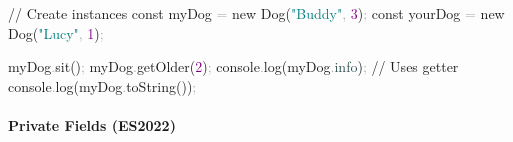 \documentclass[
  justified,
  openright,
]{tufte-book}
\let\subsubsection\paragraph
\let\paragraph\paragraph
\newcommand{\AttributeTok}[1]{\textcolor{DarkSlateGray}{#1}}
\newcommand{\BuiltInTok}[1]{#1}
\newcommand{\CommentTok}[1]{\textcolor{MidGray}{#1}}
\newcommand{\DecValTok}[1]{\textcolor{Purple}{#1}}
\newcommand{\FunctionTok}[1]{\textcolor{BrandBlue}{#1}}
\newcommand{\KeywordTok}[1]{\textcolor{BrandBlue}{#1}}
\newcommand{\NormalTok}[1]{#1}
\newcommand{\OperatorTok}[1]{\textcolor{DarkGray}{#1}}
\newcommand{\StringTok}[1]{\textcolor{Teal}{#1}}
\newenvironment{Shaded}{%
  \begin{snugshade}
}{%
  \end{snugshade}
}
\let\subsubsection\paragraph
\let\paragraph\paragraph
\begin{document}
\begin{Shaded}
\begin{Highlighting}[]
\CommentTok{// Create instances}
\KeywordTok{const}\NormalTok{ myDog }\OperatorTok{=} \KeywordTok{new} \FunctionTok{Dog}\NormalTok{(}\StringTok{"Buddy"}\OperatorTok{,} \DecValTok{3}\NormalTok{)}\OperatorTok{;}
\KeywordTok{const}\NormalTok{ yourDog }\OperatorTok{=} \KeywordTok{new} \FunctionTok{Dog}\NormalTok{(}\StringTok{"Lucy"}\OperatorTok{,} \DecValTok{1}\NormalTok{)}\OperatorTok{;}

\NormalTok{myDog}\OperatorTok{.}\FunctionTok{sit}\NormalTok{()}\OperatorTok{;}
\NormalTok{myDog}\OperatorTok{.}\FunctionTok{getOlder}\NormalTok{(}\DecValTok{2}\NormalTok{)}\OperatorTok{;}
\BuiltInTok{console}\OperatorTok{.}\FunctionTok{log}\NormalTok{(myDog}\OperatorTok{.}\AttributeTok{info}\NormalTok{)}\OperatorTok{;} \CommentTok{// Uses getter}
\BuiltInTok{console}\OperatorTok{.}\FunctionTok{log}\NormalTok{(myDog}\OperatorTok{.}\FunctionTok{toString}\NormalTok{())}\OperatorTok{;}
\end{Highlighting}
\end{Shaded}

\subsubsection{Private Fields (ES2022)}\label{private-fields-es2022}
\end{document}
